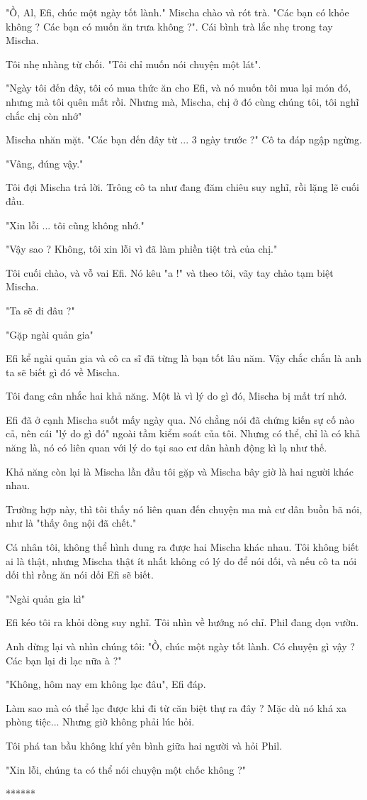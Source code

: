 "Ồ, Al, Efi, chúc một ngày tốt lành." Mischa chào và rót trà. "Các bạn có khỏe không ? Các bạn có muốn ăn trưa không ?". Cái bình trà lắc nhẹ trong tay Mischa.

Tôi nhẹ nhàng từ chối. "Tôi chỉ muốn nói chuyện một lát".

"Ngày tôi đến đây, tôi có mua thức ăn cho Efi, và nó muốn tôi mua lại món đó, nhưng mà tôi quên mất rồi. Nhưng mà, Mischa, chị ở đó cùng chúng tôi, tôi nghĩ chắc chị còn nhớ"

Mischa nhăn mặt. "Các bạn đến đây từ ... 3 ngày trước ?" Cô ta đáp ngập ngừng.

"Vâng, đúng vậy."

Tôi đợi Mischa trả lời. Trông cô ta như đang đăm chiêu suy nghĩ, rồi lặng lẽ cuối đầu.

"Xin lỗi ... tôi cũng không nhớ."

"Vậy sao ? Không, tôi xin lỗi vì đã làm phiền tiệt trà của chị."

Tôi cuối chào, và vỗ vai Efi. Nó kêu "a !" và theo tôi, vãy tay chào tạm biệt Mischa.

"Ta sẽ đi đâu ?"

"Gặp ngài quản gia"

Efi kể ngài quản gia và cô ca sĩ đã từng là bạn tốt lâu năm. Vậy chắc chắn là anh ta sẽ biết gì đó về Mischa.

Tôi đang cân nhắc hai khả năng. Một là vì lý do gì đó, Mischa bị mất trí nhớ.

Efi đã ở cạnh Mischa suốt mấy ngày qua. Nó chẳng nói đã chứng kiến sự cố nào cả, nên cái "lý do gì đó" ngoài tầm kiểm soát của tôi. Nhưng có thể, chỉ là có khả năng là, nó có liên quan với lý do tại sao cư dân hành động kì lạ như thế.

Khả năng còn lại là Mischa lần đầu tôi gặp và Mischa bây giờ là hai người khác nhau.

Trường hợp này, thì tôi thấy nó liên quan đến chuyện ma mà cư dân buồn bã nói, như là "thấy ông nội đã chết."

Cá nhân tôi, không thể hình dung ra được hai Mischa khác nhau. Tôi không biết ai là thật, nhưng Mischa thật ít nhất không có lý do để nói dối, và nếu cô ta nói dối thì rồng ăn nói dối Efi sẽ biết.

"Ngài quản gia kì"

Efi kéo tôi ra khỏi dòng suy nghĩ. Tôi nhìn về hướng nó chỉ. Phil đang dọn vườn.

Anh dừng lại và nhìn chúng tôi: "Ồ, chúc một ngày tốt lành. Có chuyện gì vậy ? Các bạn lại đi lạc nữa à ?"

"Không, hôm nay em không lạc đâu", Efi đáp.

Làm sao mà có thể lạc được khi đi từ căn biệt thự ra đây ? Mặc dù nó khá xa phòng tiệc... Nhưng giờ không phải lúc hỏi.

Tôi phá tan bầu không khí yên bình giữa hai người và hỏi Phil.

"Xin lỗi, chúng ta có thể nói chuyện một chốc không ?"

\begin{center}
	******
\end{center}


